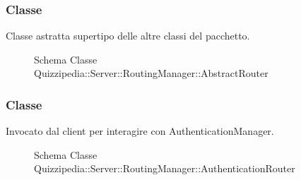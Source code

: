 \subsubsection{Classe }
Classe astratta supertipo delle altre classi del pacchetto.
\begin{figure}[H]
\centering
\noindent{}
\caption[Schema Classe AbstractRouter]{Schema Classe Quizzipedia::Server::RoutingManager::AbstractRouter}
\end{figure}
\subsubsection{Classe }
Invocato dal client per interagire con AuthenticationManager.
\begin{figure}[H]
\centering
\noindent{}
\caption[Schema Classe AuthenticationRouter]{Schema Classe Quizzipedia::Server::RoutingManager::AuthenticationRouter}
\end{figure}
